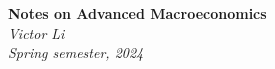 \begin{titlepage}
   \begin{center}
      \Large\textbf{Notes on Advanced Macroeconomics}\\
      \large\textit{Victor Li}\\
      \large\textit{Spring semester, 2024}
   \end{center}
\end{titlepage}
